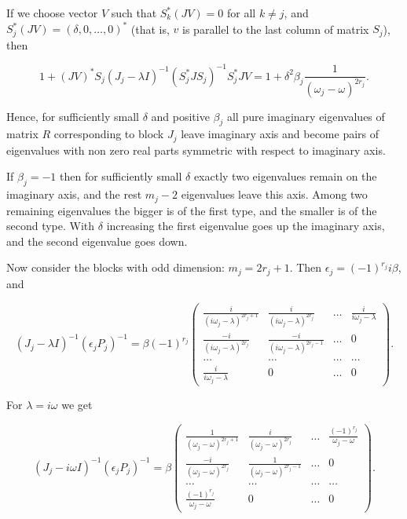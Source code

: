\documentclass[11pt, reqno]{amsart}
\theoremstyle{plain}
\begin{document}
If we choose vector $V$ such that $S_{k}^{*}(JV)=0$ for all $k\ne j$, and $S_{j}^{*}(JV)=(\delta,0,\ldots,0)^{*}$ (that is, $v$ is parallel to the last column of matrix $S_{j}$), then 

$$ 1+(JV)^{*}S_{j}(J_{j}-\lambda I)^{-1}(S_{j}^{*}JS_{j})^{-1}S_{j}^{*}JV = 
1+\delta^{2}\beta_{j} \frac{1}{(\omega_{j}-\omega)^{2r_{j}}}.
$$

Hence, for sufficiently small $\delta$ and positive $\beta_{j}$ all pure imaginary eigenvalues of matrix $R$ corresponding to block $J_{j}$ leave imaginary axis and become pairs of eigenvalues with non zero real parts symmetric with respect to imaginary axis.

If $\beta_{j}=-1$ then for sufficiently small $\delta$ exactly two eigenvalues remain on the imaginary axis, and the rest $m_{j}-2$ eigenvalues leave this axis. Among two remaining eigenvalues the bigger is of the first type, and the smaller is of the second type. With $\delta$ increasing the first eigenvalue goes up the imaginary axis, and the second eigenvalue goes down.

Now consider the blocks with odd dimension: $m_{j}=2r_{j}+1$.  Then $\epsilon_{j}=(-1)^{r_{j}}i\beta$, and 

$$ (J_{j}-\lambda I)^{-1}(\epsilon_{j}P_{j})^{-1} = 
\beta (-1)^{r_{j}} \left(\begin{array}{cccc}
\frac{i}{(i\omega_{j}-\lambda)^{2r_{j}+1}} & 
\frac{i}{(i\omega_{j}-\lambda)^{2r_{j}}} & \ldots & \frac{i}{i\omega_{j}-\lambda} \\ 
\frac{-i}{(i\omega_{j}-\lambda)^{2r_{j}}} & 
\frac{-i}{(i\omega_{j}-\lambda)^{2r_{j}-1}} & \ldots & 0 \\
\ldots & \ldots & \ldots & \ldots  \\
\frac{i}{i\omega_{j}-\lambda} & 0 & \ldots & 0 \end{array}\right).
$$

For $\lambda=i\omega$ we get

$$ (J_{j}-i\omega I)^{-1}(\epsilon_{j}P_{j})^{-1} = 
\beta \left(\begin{array}{cccc}
\frac{1}{(\omega_{j}-\omega)^{2r_{j}+1}} & 
\frac{i}{(\omega_{j}-\omega)^{2r_{j}}} & \ldots & \frac{(-1)^{r_{j}}}{\omega_{j}-\omega} \\ 
\frac{-i}{(\omega_{j}-\omega)^{2r_{j}}} & 
\frac{1}{(\omega_{j}-\omega)^{2r_{j}-1}} & \ldots & 0 \\
\ldots & \ldots & \ldots & \ldots  \\
\frac{(-1)^{r_{j}}}{\omega_{j}-\omega} & 0 & \ldots & 0 \end{array}\right).
$$
\end{document}
